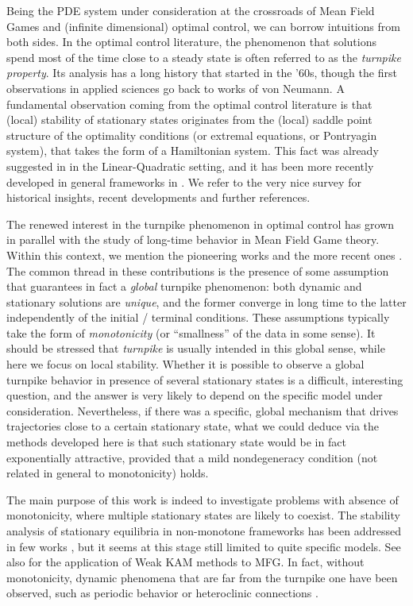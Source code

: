 \documentclass[10pt,a4paper,nouppercase,nowrite]{article}
\numberwithin{equation}{section}
\theoremstyle{definition}
\begin{document}
	\medskip
	
	Being the PDE system under consideration at the crossroads of Mean Field Games and (infinite dimensional) optimal control, we can borrow intuitions from both sides. In the optimal control literature, the phenomenon that solutions spend most of the time close to a steady state is often referred to as the \textit{turnpike property}. Its analysis has a long history that started in the '60s, though the first observations  in applied sciences go back to works of von Neumann. A fundamental observation coming from the optimal control literature is that (local) stability of stationary states originates from the (local) saddle point structure of the optimality conditions (or extremal equations, or Pontryagin system), that takes the form of a Hamiltonian system. This fact was already suggested in \cite{Wilde72} in the Linear-Quadratic setting, and it has been more recently developed in general frameworks in \cite{ZP, TZh, TZZ, TZ14}. We refer to the very nice survey \cite{TZsur} for historical insights, recent developments and further references.
	
	The renewed interest in the turnpike phenomenon in optimal control has grown in parallel with the study of long-time behavior in Mean Field Game theory. Within this context, we mention the pioneering works \cite{CLLP1, CLLP2} and the more recent ones \cite{BZ24, CP19, CCDE, CM24, CP21}. The common thread in these contributions is the presence of some assumption that guarantees in fact a \textit{global} turnpike phenomenon: both dynamic and stationary solutions are \textit{unique}, and the former converge in long time to the latter independently of the initial / terminal conditions. These assumptions typically take the form of \textit{monotonicity} (or ``smallness'' of the data in some sense). It should be stressed that \textit{turnpike} is usually intended in this global sense, while here we focus on local stability. Whether it is possible to observe a global turnpike behavior in presence of several stationary states is a difficult, interesting question, and the answer is very likely to depend on the specific model under consideration. Nevertheless, if there was a specific, global mechanism that drives trajectories close to a certain stationary state, what we could deduce via the methods developed here is that such stationary state would be in fact exponentially attractive, provided that a mild nondegeneracy condition (not related in general to monotonicity) holds.
	
	The main purpose of this work is indeed to investigate problems with absence of monotonicity, where multiple stationary states are likely to coexist. The stability analysis of stationary equilibria in non-monotone frameworks has been addressed in few works \cite{BK, CCS, CC24, MSM22}, but it seems at this stage still limited to quite specific models. See also \cite{CarMas} for the application of Weak KAM methods to MFG. In fact, without monotonicity, dynamic phenomena that are far from the turnpike one have been observed, such as periodic behavior \cite{C19} or heteroclinic connections \cite{CC21}.
	
\end{document}
